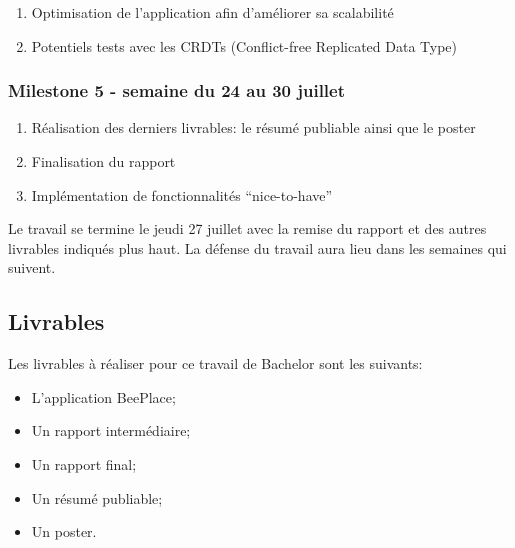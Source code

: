 \begin{enumerate}
  \item Optimisation de l'application afin d'améliorer sa scalabilité
  \item Potentiels tests avec les CRDTs (Conflict-free Replicated Data Type)
\end{enumerate}

\subsubsection{Milestone 5 - semaine du 24 au 30 juillet}

\begin{enumerate}
  \item Réalisation des derniers livrables: le résumé publiable ainsi que le poster
  \item Finalisation du rapport
  \item Implémentation de fonctionnalités “nice-to-have”
\end{enumerate}

Le travail se termine le jeudi 27 juillet avec la remise du rapport et des autres livrables indiqués plus haut. La défense du travail aura lieu dans les semaines qui suivent.

\subsection{Livrables}

Les livrables à réaliser pour ce travail de Bachelor sont les suivants:

\begin{itemize}
  \item L'application BeePlace;
  \item Un rapport intermédiaire;
  \item Un rapport final;
  \item Un résumé publiable;
  \item Un poster.
\end{itemize}

